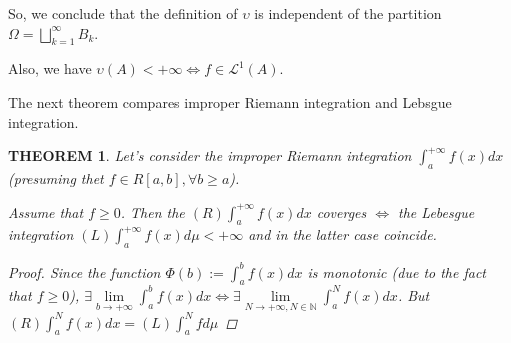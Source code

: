 \documentclass[12pt]{article}
\theoremstyle{blueplain}
\newtheorem{theorem}{THEOREM}[section]
\theoremstyle{bluedef}
\theoremstyle{blueremark}
\newcommand{\N}{\mathbb{N}}
\newcommand{\ups}{\upsilon}
\numberwithin{equation}{section}
\begin{document}
So, we conclude that the definition of $\ups$ is independent of the partition $\Omega = \bigsqcup_{k=1}^\infty B_k$.

Also, we have $\ups(A) < +\infty \iff f \in \mathcal{L}^1(A)$.





\clearpage


The next theorem compares improper Riemann integration and Lebsgue integration.

\begin{theorem}
  Let's consider the improper Riemann integration $\int_a^{+\infty} f(x) dx$ (presuming thet $f \in R[a,b], \forall b \geq a$).

  Assume that $f \geq 0$. Then the $(R) \int_a^{+\infty} f(x) dx$ coverges $\iff$ the Lebesgue integration $(L) \int_a^{+\infty} f(x) d\mu < +\infty$ and in the latter case coincide.

  \begin{proof}
    Since the function $\Phi(b):= \int_a^b f(x) dx$ is monotonic (due to the fact that $f \geq 0$), $\exists \lim\limits_{b \to +\infty} \int_a^b f(x) dx \iff \exists \lim\limits_{N \to +\infty, N \in \N} \int_a^N f(x) dx$. But $(R) \int_a^N f(x) dx = (L) \int_a^N f d\mu$
  \end{proof}
\end{theorem}


\clearpage
\end{document}
